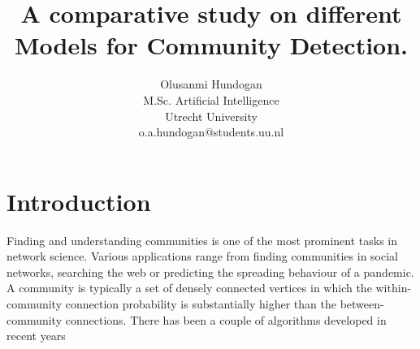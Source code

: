 \documentclass{article}
\begin{document}
\title{A comparative study on different Models for Community Detection.}
\author{Olusanmi Hundogan\\M.Sc. Artificial Intelligence\\Utrecht University\\o.a.hundogan@students.uu.nl}

\maketitle

\section{Introduction}
Finding and understanding communities is one of the most prominent tasks in network science. Various applications range from finding communities in social networks, searching the web or predicting the spreading behaviour of a pandemic. A community is typically a set of densely connected vertices in which the within-community connection probability is substantially higher than the between-community connections.\cite{} There has been a couple of algorithms developed in recent years
\end{document}
